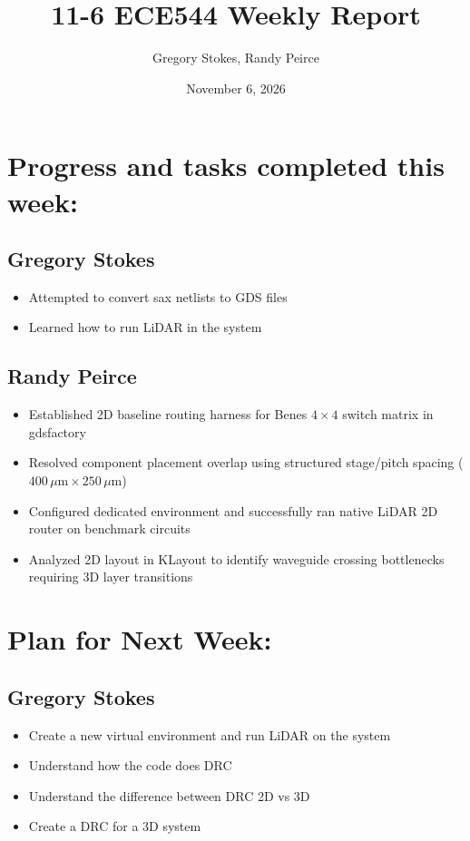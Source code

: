 \documentclass{article}
\title{11-6 ECE544 Weekly Report}
\author{Gregory Stokes, Randy Peirce}
\date{November 6, 2026}
\begin{document}
\maketitle

\section{Progress and tasks completed this week:}
\subsection{Gregory Stokes}
    \begin{itemize}
        \item Attempted to convert sax netlists to GDS files
        \item Learned how to run LiDAR in the system
    \end{itemize}
\subsection{Randy Peirce}
    \begin{itemize}
        \item Established 2D baseline routing harness for Benes $4\times4$ switch matrix in gdsfactory
        \item Resolved component placement overlap using structured stage/pitch spacing ($400\,\mu\text{m} \times 250\,\mu\text{m}$)
        \item Configured dedicated environment and successfully ran native LiDAR 2D router on benchmark circuits
        \item Analyzed 2D layout in KLayout to identify waveguide crossing bottlenecks requiring 3D layer transitions
    \end{itemize}

\section{Plan for Next Week:}
\subsection{Gregory Stokes}
    \begin{itemize}
        \item Create a new virtual environment and run LiDAR on the system
        \item Understand how the code does DRC
        \item Understand the difference between DRC 2D vs 3D
        \item Create a DRC for a 3D system
    \end{itemize}
\end{document}
